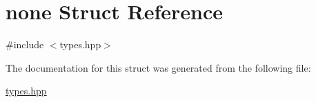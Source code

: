 \hypertarget{structnone}{}\section{none Struct Reference}
\label{structnone}


{\ttfamily \#include $<$types.\+hpp$>$}



The documentation for this struct was generated from the following file\+:\begin{DoxyCompactItemize}
\item 
\hyperlink{types_8hpp}{types.\+hpp}\end{DoxyCompactItemize}
